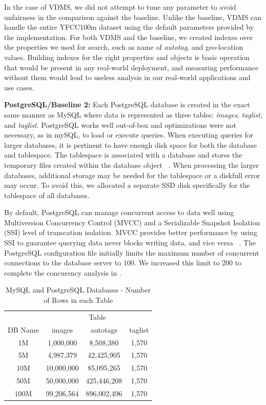 In the case of VDMS, we did not attempt to tune any
parameter to avoid unfairness in the comparison against the baseline.
Unlike the baseline, VDMS can handle the entire YFCC100m dataset using the default parameters provided by the implementation.
For both VDMS and the baseline, we created indexes over the
properties we used for search, such as name of
\textit{autotag}, and geo-location values.
Building indexes for the right properties and objects
is basic operation that would be present in any real-world deployment,
and measuring performance without them would lead to useless analysis in our
real-world applications and use cases.

\textbf{PostgreSQL/Baseline 2:}
Each PostgreSQL database is created in the exact same manner as MySQL
where data is represented as three tables:
\textit{images}, \textit{taglist}, and \textit{taglist}.
PostgreSQL works well out-of-box and optimizations were not necessary,
as in mySQL, to load or execute queries.
When executing queries for larger databases,
it is pertinent to have enough disk space for both
the database and tablespace.
The tablespace is associated with a database and stores the temporary files
created within the database object ~\cite{postgresql}.
When processing the larger databases, additional
storage may be needed for the tablespace or a diskfull error may occur. To avoid this,
we allocated a separate SSD disk specifically for the tablespace of all databases.

By default, PostgreSQL can manage concurrent access to data well using Multiversion
Concurrency Control (MVCC) and a Serializable Snapshot Isolation (SSI) level of transcation isolation.
MVCC provides better performance by using SSI to guarantee querying data never
blocks writing data, and vice versa ~\cite{postgresql}.
The PostgreSQL configuration file initially limits the maximum
number of concurrent connections to the database server to 100.
We increased this limit to 200 to complete the concurency analysis in \label{concurrency analysis}.

\begin{table}[ht]
\caption{MySQL and PostgreSQL Databases - Number of Rows in each Table}
\centering
\begin{tabular}{c c c c}
\hline\hline
 & \multicolumn{3}{c}{Table}\\
\cline{2-4}
DB Name & images & autotags & taglist\\
\hline
1M   & 1,000,000  & 8,508,380   & 1,570\\
5M   & 4,987,379  & 42,425,905  & 1,570\\
10M  & 10,000,000 & 85,095,265  & 1,570\\
50M  & 50,000,000 & 425,446,208 & 1,570\\
100M & 99,206,564 & 896,002,496 & 1,570\\
\hline
\end{tabular}
\label{table:mysqltables}
\end{table}

